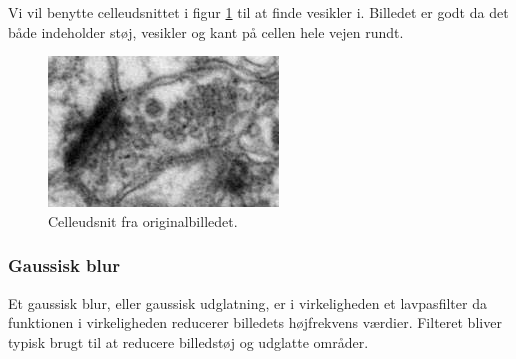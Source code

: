 Vi vil benytte celleudsnittet i figur \ref{fig:premethod_celle} til at finde vesikler i. Billedet er godt da det både indeholder støj, vesikler og kant på cellen hele vejen rundt.

\begin{figure}[H]
	\centering
	\includegraphics[scale=2.5]{files/premethod/img/celle1.png}
	\caption{Celleudsnit fra originalbilledet.\label{fig:premethod_celle}}
\end{figure}

\subsubsection{Gaussisk blur}
Et gaussisk blur, eller gaussisk udglatning, er i virkeligheden et lavpasfilter da funktionen i virkeligheden reducerer billedets højfrekvens værdier. Filteret bliver typisk brugt til at reducere billedstøj og udglatte områder. 

